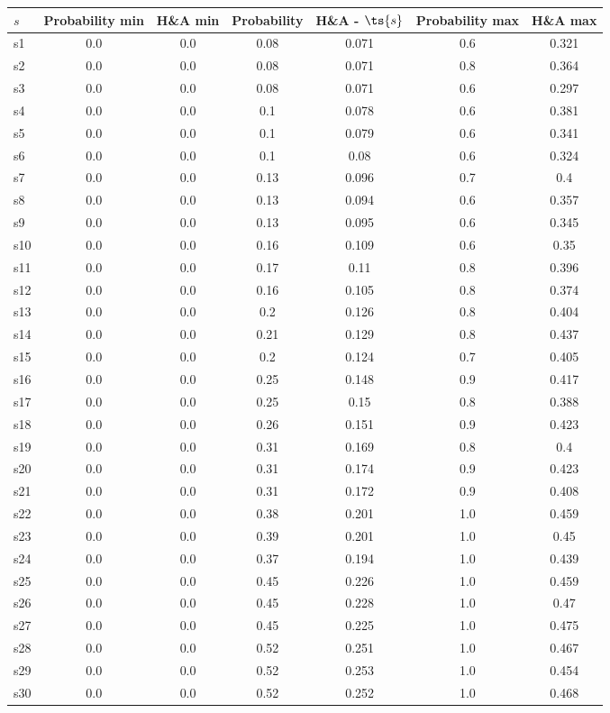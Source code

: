 \documentclass{article}
\begin{document}
\noindent\begin{tabular}{|l|c|c|c|c|c|c|}
\hline
$s$& Probability min & H\&A min & Probability & H\&A - $\ts{s}$ & Probability max & H\&A max\\
\hline
s1 &0.0 & 0.0 & 0.08 & 0.071 & 0.6 & 0.321\\
\hline
s2 &0.0 & 0.0 & 0.08 & 0.071 & 0.8 & 0.364\\
\hline
s3 &0.0 & 0.0 & 0.08 & 0.071 & 0.6 & 0.297\\
\hline
s4 &0.0 & 0.0 & 0.1 & 0.078 & 0.6 & 0.381\\
\hline
s5 &0.0 & 0.0 & 0.1 & 0.079 & 0.6 & 0.341\\
\hline
s6 &0.0 & 0.0 & 0.1 & 0.08 & 0.6 & 0.324\\
\hline
s7 &0.0 & 0.0 & 0.13 & 0.096 & 0.7 & 0.4\\
\hline
s8 &0.0 & 0.0 & 0.13 & 0.094 & 0.6 & 0.357\\
\hline
s9 &0.0 & 0.0 & 0.13 & 0.095 & 0.6 & 0.345\\
\hline
s10 &0.0 & 0.0 & 0.16 & 0.109 & 0.6 & 0.35\\
\hline
s11 &0.0 & 0.0 & 0.17 & 0.11 & 0.8 & 0.396\\
\hline
s12 &0.0 & 0.0 & 0.16 & 0.105 & 0.8 & 0.374\\
\hline
s13 &0.0 & 0.0 & 0.2 & 0.126 & 0.8 & 0.404\\
\hline
s14 &0.0 & 0.0 & 0.21 & 0.129 & 0.8 & 0.437\\
\hline
s15 &0.0 & 0.0 & 0.2 & 0.124 & 0.7 & 0.405\\
\hline
s16 &0.0 & 0.0 & 0.25 & 0.148 & 0.9 & 0.417\\
\hline
s17 &0.0 & 0.0 & 0.25 & 0.15 & 0.8 & 0.388\\
\hline
s18 &0.0 & 0.0 & 0.26 & 0.151 & 0.9 & 0.423\\
\hline
s19 &0.0 & 0.0 & 0.31 & 0.169 & 0.8 & 0.4\\
\hline
s20 &0.0 & 0.0 & 0.31 & 0.174 & 0.9 & 0.423\\
\hline
s21 &0.0 & 0.0 & 0.31 & 0.172 & 0.9 & 0.408\\
\hline
s22 &0.0 & 0.0 & 0.38 & 0.201 & 1.0 & 0.459\\
\hline
s23 &0.0 & 0.0 & 0.39 & 0.201 & 1.0 & 0.45\\
\hline
s24 &0.0 & 0.0 & 0.37 & 0.194 & 1.0 & 0.439\\
\hline
s25 &0.0 & 0.0 & 0.45 & 0.226 & 1.0 & 0.459\\
\hline
s26 &0.0 & 0.0 & 0.45 & 0.228 & 1.0 & 0.47\\
\hline
s27 &0.0 & 0.0 & 0.45 & 0.225 & 1.0 & 0.475\\
\hline
s28 &0.0 & 0.0 & 0.52 & 0.251 & 1.0 & 0.467\\
\hline
s29 &0.0 & 0.0 & 0.52 & 0.253 & 1.0 & 0.454\\
\hline
s30 &0.0 & 0.0 & 0.52 & 0.252 & 1.0 & 0.468\\
\hline
\end{tabular}\\
\end{document}
